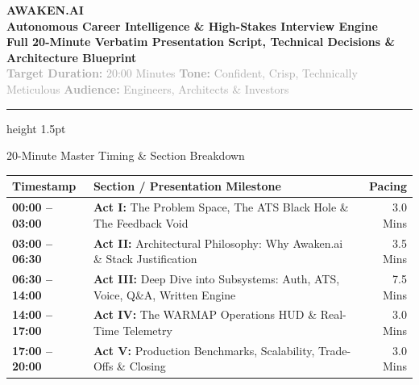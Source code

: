 \documentclass[11pt,a4paper]{article}
\begin{document}
\begin{center}
    {\huge \textbf{\color{primaryblack}AWAKEN.AI}}\\[0.3em]
    {\Large \textbf{\color{highlightblue}Autonomous Career Intelligence \& High-Stakes Interview Engine}}\\[0.5em]
    {\normalsize \textbf{Full 20-Minute Verbatim Presentation Script, Technical Decisions \& Architecture Blueprint}}\\[0.8em]
    \textcolor{darkgray}{\small \textbf{Target Duration:} 20:00 Minutes \quad\textbar\quad \textbf{Tone:} Confident, Crisp, Technically Meticulous \quad\textbar\quad \textbf{Audience:} Engineers, Architects \& Investors}
\end{center}

\vspace{0.5em}
\hrule height 1.5pt
\vspace{1em}

\begin{timingbox}{20-Minute Master Timing \& Section Breakdown}
\begin{tabularx}{\textwidth}{l p{7.5cm} r}
\textbf{Timestamp} & \textbf{Section / Presentation Milestone} & \textbf{Pacing} \\
\midrule
\textbf{00:00 -- 03:00} & \textbf{Act I:} The Problem Space, The ATS Black Hole \& The Feedback Void & 3.0 Mins \\
\textbf{03:00 -- 06:30} & \textbf{Act II:} Architectural Philosophy: Why Awaken.ai \& Stack Justification & 3.5 Mins \\
\textbf{06:30 -- 14:00} & \textbf{Act III:} Deep Dive into Subsystems: Auth, ATS, Voice, Q\&A, Written Engine & 7.5 Mins \\
\textbf{14:00 -- 17:00} & \textbf{Act IV:} The WARMAP Operations HUD \& Real-Time Telemetry & 3.0 Mins \\
\textbf{17:00 -- 20:00} & \textbf{Act V:} Production Benchmarks, Scalability, Trade-Offs \& Closing & 3.0 Mins \\
\bottomrule
\end{tabularx}
\end{timingbox}

\vspace{1em}

\end{document}
